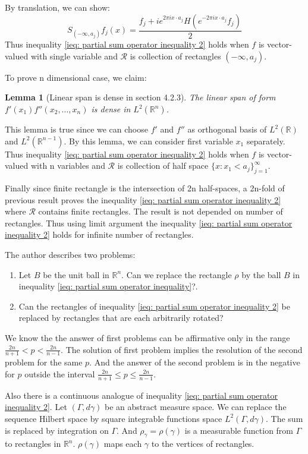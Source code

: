 \documentclass{report}
\theoremstyle{definition}
\theoremstyle{definition}
\theoremstyle{plain}
\newtheorem{lemma}[theorem]{Lemma}
\numberwithin{theorem}{section}
\numberwithin{remark}{section}
\numberwithin{equation}{section}
\begin{document}
By translation, we can show:
\begin{equation*}
    S_{(-\infty,a_j)}f_j(x)=\frac{f_j+ie^{2\pi i x\cdot a_j}H(e^{-2\pi i x\cdot a_j}f_j)}{2}
\end{equation*}
Thus inequality \eqref{ieq: partial sum operator inequality 2} holds when $f$ is vector-valued with single variable and $\mathscr{R}$ is collection of rectangles $(-\infty,a_j)$.\par
To prove n dimensional case, we claim:
\begin{lemma}[Linear span is dense in section 4.2.3]
    The linear span of form $f'(x_1)f''(x_2,\dots,x_n)$ is dense in $L^2(\mathbb{R}^n)$.
\end{lemma}
This lemma is true since we can choose $f'$ and $f''$ as orthogonal basis of $L^2(\mathbb{R})$ and $L^2(\mathbb{R}^{n-1})$. By this lemma, we can consider first variable $x_1$ separately. Thus inequality \eqref{ieq: partial sum operator inequality 2} holds when $f$ is vector-valued with n variables and $\mathscr{R}$ is collection of half space $\{x:x_1<a_j\}_{j=1}^\infty$.\par
Finally since finite rectangle is the intersection of 2n half-spaces, a 2n-fold of previous result proves the inequality \eqref{ieq: partial sum operator inequality 2} where $\mathscr{R}$ contains finite rectangles. The result is not depended on number of rectangles. Thus using limit argument the inequality \eqref{ieq: partial sum operator inequality 2} holds for infinite number of rectangles.\par
The author describes two problems:
\begin{enumerate}
    \item Let $B$ be the unit ball in $\mathbb{R}^n$. Can we replace the rectangle $\rho$ by the ball $B$ in inequality \eqref{ieq: partial sum operator inequality}?.
    \item Can the rectangles of inequality \eqref{ieq: partial sum operator inequality 2} be replaced by rectangles that are each arbitrarily rotated?
\end{enumerate}
We know the the answer of first problems can be affirmative only in the range $\frac{2n}{n+1}<p<\frac{2n}{n-1}$. The solution of first problem implies the resolution of the second problem for the same $p$. And the answer of the second problem is in the negative for $p$ outside the interval $\frac{2n}{n+1}\leq p\leq \frac{2n}{n-1}$.\par
Also there is a continuous analogue of inequality \eqref{ieq: partial sum operator inequality 2}. Let $(\Gamma,d\gamma)$ be an abstract measure space. We can replace the sequence Hilbert space by square integrable functions space $L^2(\Gamma,d\gamma)$. The sum is replaced by integration on $\Gamma$. And $\rho_\gamma=\rho(\gamma)$ is a measurable function from $\Gamma$ to rectangles in $\mathbb{R}^n$. $\rho(\gamma)$ maps each $\gamma$ to the vertices of rectangles.\par
\end{document}
